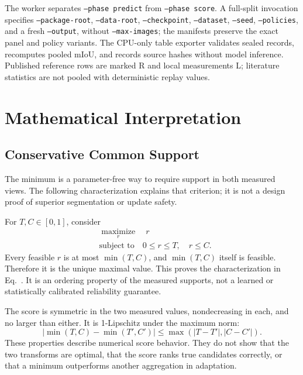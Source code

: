 The worker separates \texttt{--phase predict} from \texttt{--phase score}. A full-split invocation specifies \texttt{--package-root}, \texttt{--data-root}, \texttt{--checkpoint}, \texttt{--dataset}, \texttt{--seed}, \texttt{--policies}, and a fresh \texttt{--output}, without \texttt{--max-images}; the manifests preserve the exact panel and policy variants. The CPU-only table exporter validates sealed records, recomputes pooled mIoU, and records source hashes without model inference. Published reference rows are marked R and local measurements L; literature statistics are not pooled with deterministic replay values.

\section{Mathematical Interpretation}
\label{app:theory}
\subsection{Conservative Common Support}
The minimum is a parameter-free way to require support in both measured views. The following characterization explains that criterion; it is not a design proof of superior segmentation or update safety.

For $T,C\in[0,1]$, consider
\begin{equation}
\begin{aligned}
&\underset{r}{\operatorname{maximize}}\quad r\\
&\text{subject to}\quad 0\leq r\leq T,\quad r\leq C.
\end{aligned}
\end{equation}
Every feasible $r$ is at most $\min(T,C)$, and $\min(T,C)$ itself is feasible. Therefore it is the unique maximal value. This proves the characterization in Eq.~. It is an ordering property of the measured supports, not a learned or statistically calibrated reliability guarantee.

The score is symmetric in the two measured values, nondecreasing in each, and no larger than either. It is 1-Lipschitz under the maximum norm:
\begin{equation}
|\min(T,C)-\min(T',C')|
\leq\max(|T-T'|,|C-C'|).
\end{equation}
These properties describe numerical score behavior. They do not show that the two transforms are optimal, that the score ranks true candidates correctly, or that a minimum outperforms another aggregation in adaptation.

